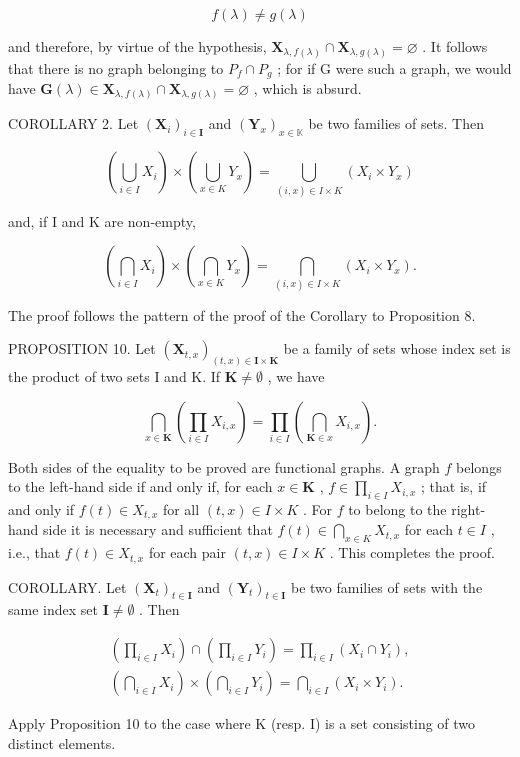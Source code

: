 \[
f (\lambda) \neq g (\lambda)
\]

and therefore, by virtue of the hypothesis, \(\mathbf{X}_{\lambda,f(\lambda)} \cap \mathbf{X}_{\lambda,g(\lambda)} = \varnothing\) . It follows that there is no graph belonging to \(P_{f} \cap P_{g}\) ; for if G were such a graph, we would have \(\mathbf{G}(\lambda) \in \mathbf{X}_{\lambda,f(\lambda)} \cap \mathbf{X}_{\lambda,g(\lambda)} = \varnothing\) , which is absurd.

COROLLARY 2. Let \((\mathbf{X}_i)_{i\in \mathbf{I}}\) and \((\mathbf{Y}_x)_{x\in \mathbb{K}}\) be two families of sets. Then

\[
\left(\bigcup_ {i \in I} X _ {i}\right) \times \left(\bigcup_ {x \in K} Y _ {x}\right) = \bigcup_ {(i, x) \in I \times K} (X _ {i} \times Y _ {x})
\]

and, if I and K are non-empty,

\[
\left(\bigcap_ {i \in I} X _ {i}\right) \times \left(\bigcap_ {x \in K} Y _ {x}\right) = \bigcap_ {(i, x) \in I \times K} (X _ {i} \times Y _ {x}).
\]

The proof follows the pattern of the proof of the Corollary to Proposition 8.

PROPOSITION 10. Let \((\mathbf{X}_{t,x})_{(t,x)\in \mathbf{I}\times \mathbf{K}}\) be a family of sets whose index set is the product of two sets I and K. If \(\mathbf{K}\neq \emptyset\) , we have

\[
\bigcap_ {x \in \mathbf {K}} \left(\prod_ {i \in I} X _ {i, x}\right) = \prod_ {i \in I} \left(\bigcap_ {\mathbf {K} \in x} X _ {i, x}\right).
\]

Both sides of the equality to be proved are functional graphs. A graph \(f\) belongs to the left-hand side if and only if, for each \(x \in \mathbf{K}\) , \(f \in \prod_{i \in I} X_{i,x}\) ; that is, if and only if \(f(t) \in X_{t,x}\) for all \((t,x) \in I \times K\) . For \(f\) to belong to the right-hand side it is necessary and sufficient that \(f(t) \in \bigcap_{x \in K} X_{t,x}\) for each \(t \in I\) , i.e., that \(f(t) \in X_{t,x}\) for each pair \((t, x) \in I \times K\) . This completes the proof.

COROLLARY. Let \((\mathbf{X}_t)_{t\in \mathbf{I}}\) and \((\mathbf{Y}_t)_{t\in \mathbf{I}}\) be two families of sets with the same index set \(\mathbf{I}\neq \emptyset\) . Then

\[
\begin{array}{l} \left(\prod_ {i \in I} X _ {i}\right) \cap \left(\prod_ {i \in I} Y _ {i}\right) = \prod_ {i \in I} (X _ {i} \cap Y _ {i}), \\ \left(\bigcap_ {i \in I} X _ {i}\right) \times \left(\bigcap_ {i \in I} Y _ {i}\right) = \bigcap_ {i \in I} (X _ {i} \times Y _ {i}). \end{array}
\]

Apply Proposition 10 to the case where K (resp. I) is a set consisting of two distinct elements.

